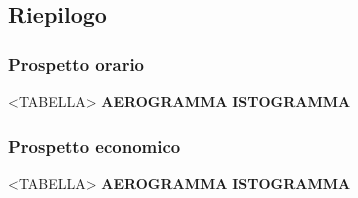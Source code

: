 \subsection{Riepilogo}

\subsubsection{Prospetto orario}

<TABELLA>
\textbf{AEROGRAMMA}
\textbf{ISTOGRAMMA}

\subsubsection{Prospetto economico}

<TABELLA>
\textbf{AEROGRAMMA}
\textbf{ISTOGRAMMA}

